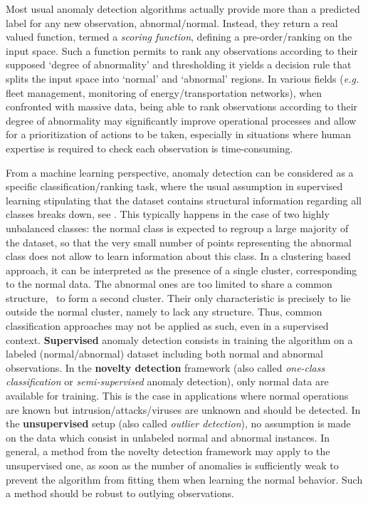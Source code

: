  Most usual anomaly detection algorithms actually
provide more than a predicted label for any new observation, abnormal/normal. Instead,
they return a real valued function,  termed a \textit{scoring function}, defining a pre-order/ranking on the input space. Such a function permits to rank any observations according to their supposed `degree of abnormality' and thresholding it yields a decision rule that splits the input space into `normal' and `abnormal' regions.
In various fields (\textit{e.g.} fleet management, monitoring of energy/transportation networks), when confronted with massive data, being able to rank observations according to their degree of abnormality may significantly improve operational processes and allow for a prioritization of actions to be taken, especially in situations where human expertise is required to check each observation is time-consuming.


From a machine learning perspective, anomaly detection can be considered as a specific classification/ranking task, where the usual assumption in supervised learning stipulating that the dataset contains structural information regarding all classes breaks down, see \cite{Roberts99}. This typically happens in the case of two highly unbalanced classes: the normal class is expected to regroup a large majority of the dataset, so that the very small number of points representing the abnormal class does not allow to learn information about this class.
In a clustering based approach, it can be
interpreted as the presence of a single cluster, corresponding to the
normal data. The abnormal ones are too limited to share a common
structure, \ie~to form a second cluster. Their only characteristic is
precisely to lie outside the normal cluster, namely to lack any
structure.  Thus, common classification approaches may not be applied
as such, even in a supervised
context. %
\textbf{Supervised} anomaly detection consists in training the algorithm on a labeled (normal/abnormal) dataset including both normal and abnormal observations. In the \textbf{novelty detection} framework (also called \emph{one-class classification} or \emph{semi-supervised} anomaly detection), only normal data are available for training. This is the case in applications where normal operations are known but intrusion/attacks/viruses are unknown and should be detected. In the \textbf{unsupervised} setup (also called \emph{outlier detection}), no assumption is made on the data which consist in unlabeled normal and abnormal instances. In general, a method from the novelty detection framework may apply to the unsupervised one, as soon as the number of anomalies is sufficiently weak to prevent the algorithm from fitting them when learning the normal behavior. Such a method should be robust to outlying observations.

